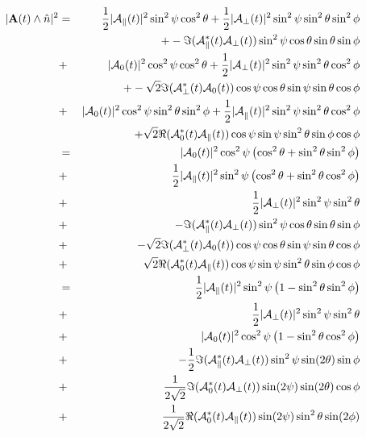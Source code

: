 \documentclass[a4paper,10pt,twosided]{article}
\begin{document}
\begin{eqnarray}
\label{arr:bigarray}
  |{ \bf A}(t) \wedge \hat{n}|^2 &=& 
                                  \frac{1}{2} |{\cal A}_\parallel(t)|^2 \sin^2\psi \cos^2\theta  +  \frac{1 }{2}|{\cal A}_\perp(t)|^2\sin^2\psi\sin^2\theta\sin^2\phi  \\
                              &&+     -\Im({\cal A}_\parallel^*(t){\cal A}_\perp(t))\sin^2\psi\cos\theta\sin\theta\sin\phi  \\
                              &+&     |{\cal A}_0(t)|^2 \cos^2\psi\cos^2\theta  + \frac{1}{2} |{\cal A}_\perp(t)|^2\sin^2\psi \sin^2\theta\cos^2\phi \\
                              &&+     -\sqrt{2}\Im({\cal A}_\perp^*(t) {\cal A}_0(t) )\cos\psi\cos\theta\sin\psi\sin\theta\cos\phi \\
                              &+&     |{\cal A}_0(t)|^2 \cos^2\psi\sin^2\theta\sin^2\phi  + \frac{1}{2}{|\cal A}_\parallel(t)|^2 \sin^2\psi \sin^2\theta\cos^2\phi       \\
                              &&+     \sqrt{2}\Re({\cal A}_0^*(t){\cal A}_\parallel(t)  )\cos\psi\sin\psi\sin^2\theta\sin\phi\cos\phi\\
                              &=&  |{\cal A}_0(t)|^2 \cos^2\psi\left( \cos^2\theta  +  \sin^2\theta\sin^2\phi\right) \\
                              &+& \frac{1}{2}|{\cal A}_\parallel(t)|^2 \sin^2\psi \left( \cos^2\theta + \sin^2\theta\cos^2\phi    \right)  \\
                              &+&\frac{1}{2}|{\cal A}_\perp(t)|^2\sin^2\psi\sin^2\theta \\
                              &+&     -\Im({\cal A}_\parallel^*(t){\cal A}_\perp(t))\sin^2\psi\cos\theta\sin\theta\sin\phi  \\
                              &+&     -\sqrt{2}\Im({\cal A}_\perp^*(t) {\cal A}_0(t) )\cos\psi\cos\theta\sin\psi\sin\theta\cos\phi \\
                              &+&     \sqrt{2}\Re({\cal A}_0^*(t){\cal A}_\parallel(t)  )\cos\psi\sin\psi\sin^2\theta\sin\phi\cos\phi\\
                              &=&\frac{1}{2}|{\cal A}_\parallel(t)|^2 \sin^2\psi \left( 1 -  \sin^2\theta\sin^2\phi    \right)  \\
                              &+&\frac{1}{2}|{\cal A}_\perp(t)|^2\sin^2\psi\sin^2\theta \\
                              &+&   |{\cal A}_0(t)|^2 \cos^2\psi\left( 1  -  \sin^2\theta\cos^2\phi\right) \\
                              &+&     -\frac{1}{2}\Im({\cal A}_\parallel^*(t){\cal A}_\perp(t))\sin^2\psi\sin(2\theta)\sin\phi  \\
                              &+&     \frac{1}{2\sqrt{2}}\Im({\cal A}_0^*(t) {\cal A}_\perp(t) ) \sin(2\psi)\sin(2\theta)\cos\phi \\
                              &+&     \frac{1}{2\sqrt{2}}\Re({\cal A}_0^*(t) {\cal A}_\parallel(t))\sin(2\psi)\sin^2\theta\sin(2\phi)
\end{eqnarray}
\end{document}
